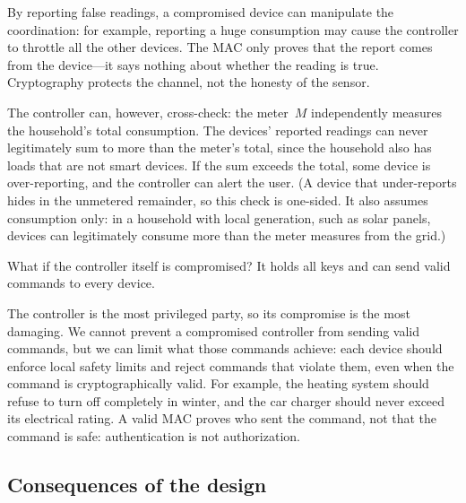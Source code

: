 By reporting false readings, a compromised device can manipulate the
coordination: for example, reporting a huge consumption may cause the
controller to throttle all the other devices.
The MAC only proves that the report comes from the device---it says nothing
about whether the reading is true.
Cryptography protects the channel, not the honesty of the sensor.

The controller can, however, cross-check: the meter~\(M\) independently
measures the household's total consumption.
The devices' reported readings can never legitimately sum to more than the
meter's total, since the household also has loads that are not smart
devices.
If the sum exceeds the total, some device is over-reporting, and the
controller can alert the user.
(A device that under-reports hides in the unmetered remainder, so this
check is one-sided.
It also assumes consumption only: in a household with local generation,
such as solar panels, devices can legitimately consume more than the
meter measures from the grid.)

\begin{exercise}
  What if the controller itself is compromised?
  It holds all keys and can send valid commands to every device.
\end{exercise}

The controller is the most privileged party, so its compromise is the most
damaging.
We cannot prevent a compromised controller from sending valid commands, but
we can limit what those commands achieve: each device should enforce local
safety limits and reject commands that violate them, even when the command
is cryptographically valid.
For example, the heating system should refuse to turn off completely in
winter, and the car charger should never exceed its electrical rating.
A valid MAC proves who sent the command, not that the command is safe:
authentication is not authorization.

\subsection{Consequences of the design}

